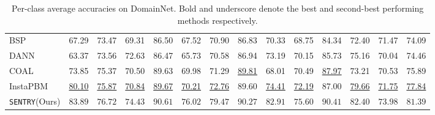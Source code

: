 \documentclass[10pt,twocolumn,letterpaper]{article}
\newcommand{\method}{\texttt{SENTRY}\xspace}
\begin{document}
\begin{table*}[t]
\begin{center}
{\begin{tabular}{l c c c c c c c c c c c c c}
        BSP~\cite{chen2019transferability} & 67.29 & 73.47 & 69.31 & 86.50 & 67.52 & 70.90 & 86.83 & 70.33 & 68.75 & 84.34 & 72.40 & 71.47 & 74.09 \\
        DANN~\cite{ganin2014unsupervised} & 63.37 & 73.56 & 72.63 & 86.47 & 65.73 & 70.58 & 86.94 & 73.19 & 70.15 & 85.73 & 75.16 & 70.04 & 74.46 \\
        COAL~\cite{tan2019generalized} & 73.85 & 75.37 & 70.50 & 89.63 & 69.98 & 71.29 & \underline{89.81} & 68.01 & 70.49 & \underline{87.97} & 73.21 & 70.53 & 75.89 \\
        InstaPBM~\cite{li2020rethinking} & \underline{80.10} & \underline{75.87} & \underline{70.84} & \underline{89.67} & \underline{70.21} & \underline{72.76} & 89.60 & \underline{74.41} & \underline{72.19} & 87.00 & \underline{79.66} & \underline{71.75} & \underline{77.84} \\
        \midrule
        \method (Ours) & $\mathbf{83.89}$ & $\mathbf{76.72}$ & $\mathbf{74.43}$ & $\mathbf{90.61}$ & $\mathbf{76.02}$ & $\mathbf{79.47}$ & $\mathbf{90.27}$ & $\mathbf{82.91}$ & $\mathbf{75.60}$ & $\mathbf{90.41}$ & $\mathbf{82.40}$ & $\mathbf{73.98}$ & $\mathbf{81.39}$ \\        
        \bottomrule
        \end{tabular}}
        \vspace{-5pt}
        \caption{Per-class average accuracies on DomainNet. Bold and underscore denote the best and second-best performing methods respectively.}\label{tab:domainnet}
        \vspace{-10pt}
    \end{center}
    \end{table*}
\end{document}
